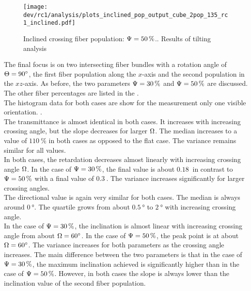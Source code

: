 % 
\begin{figure}[!p]
\centering
\texttt{[image: dev/rc1/analysis/plots\_inclined\_pop\_output\_cube\_2pop\_135\_rc1\_inclined.pdf]}
\caption[]{Inclined crossing fiber population: $\textnormal{$\Psi$}=\SI{50}{\percent}$.. Results of tilting analysis}
\label{fig:inclined_05_fiber_pop_rofl}
\end{figure}
% 
% 
The final focus is on two intersecting fiber bundles with a rotation angle of $\textnormal{$\Theta$} = \SI{90}{\degree}$, \ie{} the first fiber population along the $x$-axis and the second population in the $xz$-axis.
As before, the two parameters $\textnormal{$\Psi$} = \SI{30}{\percent}$ and $\textnormal{$\Psi$} = \SI{50}{\percent}$ are discussed.
The other fiber percentages are listed in the \dummy[appendix]{}.
\\
% 
The histogram data for both cases are show for the measurement only one visible orientation.
\dummy{}.
\\
The transmittance is almost identical in both cases.
It increases with increasing crossing angle, but the slope decreases for larger $\textnormal{$\Omega$}$.
The median increases to a value of $\SI{110}{\percent}$ in both cases as opposed to the flat case.
The variance remains similar for all values.
\\
In both cases, the retardation decreases almost linearly with increasing crossing angle $\textnormal{$\Omega$}$.
In the case of $\textnormal{$\Psi$} = \SI{30}{\percent}$, the final value is about $\SI{0.18}{}$ in contrast to $\textnormal{$\Psi$} = \SI{50}{\percent}$ with a final value of $\SI{0.3}{}$.
The variance increases significantly for larger crossing angles.
\\
The directional value is again very similar for both cases.
The median is always around $\SI{0}{\degree}$.
The quartile grows from about $\SI{0.5}{\degree}$ to $\SI{2}{\degree}$ with increasing crossing angle.
\\
In the case of $\textnormal{$\Psi$} = \SI{30}{\percent}$, the inclination is almost linear with increasing crossing angle from about $\textnormal{$\Omega$} =\SI{60}{\degree}$.
In the case of $\textnormal{$\Psi$} = \SI{50}{\percent}$, the peak point is at about $\textnormal{$\Omega$} = \SI{60}{\degree}$.
The variance increases for both parameters as the crossing angle increases.
The main difference between the two parameters is that in the case of $\textnormal{$\Psi$} = \SI{30}{\percent}$, the maximum inclination achieved is significantly higher than in the case of $\textnormal{$\Psi$} = \SI{50}{\percent}$.
However, in both cases the slope is always lower than the inclination value of the second fiber population.
